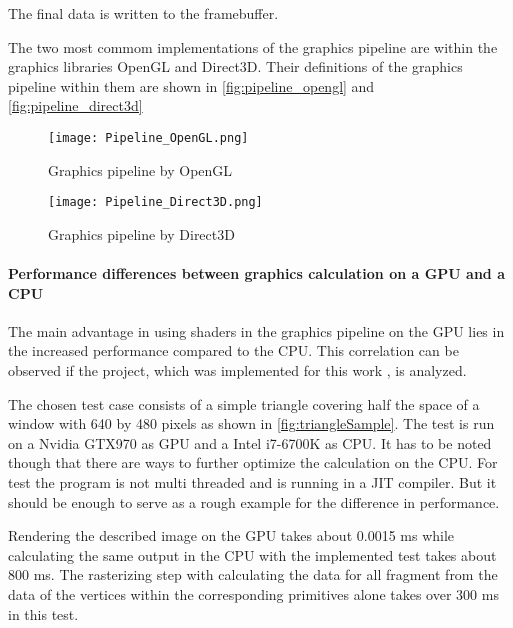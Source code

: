 The final data is written to the framebuffer.

The two most commom implementations of the graphics pipeline are within the graphics libraries OpenGL and Direct3D. Their definitions of the graphics pipeline within them are shown in  \autoref{fig:pipeline_opengl} and \autoref{fig:pipeline_direct3d}

\nocite{Khronos_pipeline.2019}
\nocite{Microsoft_pipeline.2018}

\begin{figure}[h!]
  \centering 
  \texttt{[image: Pipeline\_OpenGL.png]}
  \caption[Graphics pipeline by OpenGL ]{Graphics pipeline by OpenGL}
  \label{fig:pipeline_opengl}
\end{figure}

\begin{figure}[h!]
  \centering 
  \texttt{[image: Pipeline\_Direct3D.png]}
  \caption[Graphics pipeline by Direct3D ]{Graphics pipeline by Direct3D}
  \label{fig:pipeline_direct3d}
\end{figure}

\newpage

\paragraph{Performance differences between graphics calculation on a GPU and a CPU}
\label{paragraph:performanceDif}

The main advantage in using shaders in the graphics pipeline on the GPU lies in the increased performance compared to the CPU.
This correlation can be observed if the project, which was implemented for this work , is analyzed.

The chosen test case consists of a simple triangle covering half the space of a window with 640 by 480 pixels as shown in \autoref{fig:triangleSample}. The test is run on a Nvidia GTX970 as GPU and a Intel i7-6700K as CPU. It has to be noted though that there are ways to further optimize the calculation on the CPU. For test the program is not multi threaded and is running in a JIT compiler. But it should be enough to serve as a rough example for the difference in performance.

Rendering the described image on the GPU takes about 0.0015 ms while calculating the same output in the CPU with the implemented test takes about 800 ms. The rasterizing step with calculating the data for all fragment from the data of the vertices within the corresponding primitives alone takes over 300 ms in this test.

